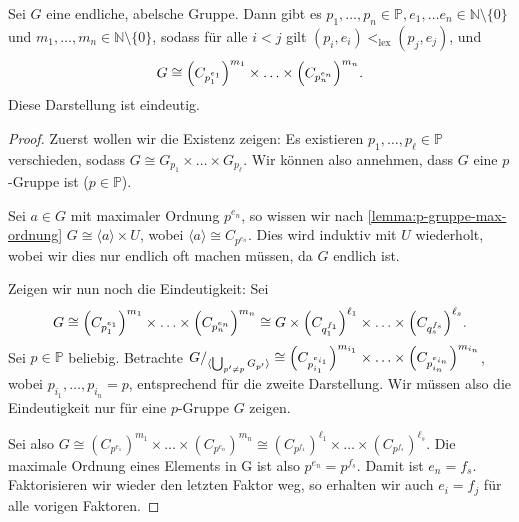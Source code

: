 \begin{theorem}
    Sei $G$ eine endliche, abelsche Gruppe. Dann gibt es $p_1, \hdots, p_n \in \mathbb{P}, e_1, \hdots e_n \in \mathbb{N} \setminus \{0\}$ und $m_1, \hdots, m_n \in \mathbb{N} \setminus \{0\}$, sodass für alle $i < j$ gilt $(p_i, e_i) <_{\text{lex}} (p_j, e_j)$, und
    $$ G \cong \Bigl( C_{p_1^{e_1}} \Bigr)^{m_1} \times \hdots \times \Bigl( C_{p_n^{e_n}} \Bigr)^{m_n}. $$
    Diese Darstellung ist eindeutig.
\end{theorem}

\begin{proof} 
    Zuerst wollen wir die Existenz zeigen: Es existieren $p_1, \hdots, p_\ell \in \mathbb{P}$ verschieden, sodass $G \cong G_{p_1} \times \hdots \times G_{p_\ell}$. Wir können also \obda annehmen, dass $G$ eine $p$-Gruppe ist ($p \in \mathbb{P}$).

    Sei $a \in G$ mit maximaler Ordnung $p^{e_n}$, so wissen wir nach \cref{lemma:p-gruppe-max-ordnung} $G \cong \langle a \rangle \times U$, wobei $\langle a \rangle \cong C_{p^{e_n}}$. Dies wird induktiv mit $U$ wiederholt, wobei wir dies nur endlich oft machen müssen, da $G$ endlich ist.

    Zeigen wir nun noch die Eindeutigkeit: Sei $$G \cong \Bigl( C_{p_1^{e_1}} \Bigr)^{m_1} \times \hdots \times \Bigl( C_{p_n^{e_n}} \Bigr)^{m_n} \cong G \times \Bigl( C_{q_1^{f_1}} \Bigr)^{\ell_1} \times \hdots \times \Bigl( C_{q_s^{f_s}} \Bigr)^{\ell_s} .$$ Sei $p \in \mathbb{P}$ beliebig. Betrachte $G /_{\langle \bigcup_{p' \neq p} G_{p'} \rangle} \cong \Bigl( C_{p_{i_1}^{e_{i_1}}} \Bigr)^{m_{i_1}} \times \hdots \times \Bigl( C_{p_{i_n}^{e_{i_n}}} \Bigr)^{m_{i_n}}$, wobei $p_{i_1}, \hdots, p_{i_n} = p$, entsprechend für die zweite Darstellung. Wir müssen also \obda die Eindeutigkeit nur für eine $p$-Gruppe $G$ zeigen.

    Sei also $G \cong (C_{p^{e_1}})^{m_1} \times \hdots \times (C_{p^{e_n}})^{m_n} \cong (C_{p^{f_1}})^{\ell_1} \times \hdots \times (C_{p^{f_s}})^{\ell_s}$. Die maximale Ordnung eines Elements in G ist also $p^{e_n} = p^{f_s}$. Damit ist $e_n = f_s$. Faktorisieren wir wieder den letzten Faktor weg, so erhalten wir auch $e_i = f_j$ für alle vorigen Faktoren.
\end{proof}